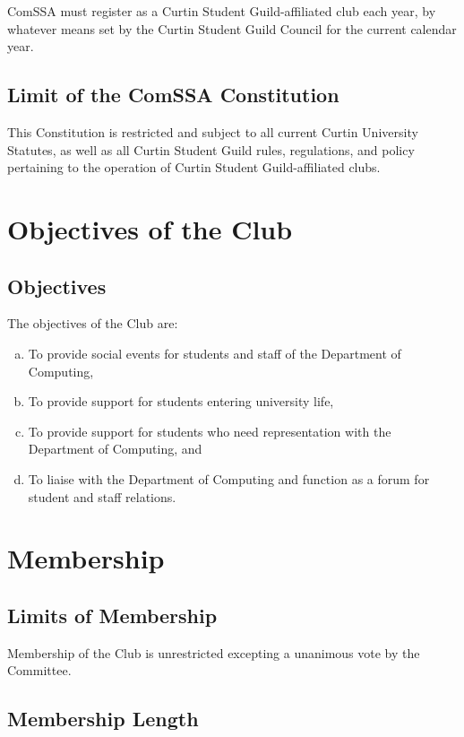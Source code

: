 \documentclass[a4paper,12pt]{article}
\begin{document}
ComSSA must register as a Curtin Student Guild-affiliated club each year, by whatever means set by the Curtin Student Guild Council for the current calendar year.

\subsection{Limit of the ComSSA Constitution}

This Constitution is restricted and subject to all current Curtin University Statutes, as well as all Curtin Student Guild rules, regulations, and policy pertaining to the operation of Curtin Student Guild-affiliated clubs.

\section{Objectives of the Club}

\subsection{Objectives}

The objectives of the Club are:

\begin{enumerate}[a)]
	\item To provide social events for students and staff of the Department of Computing,
	\item To provide support for students entering university life,
	\item To provide support for students who need representation with the Department of Computing, and
	\item To liaise with the Department of Computing and function as a forum for student and staff relations.
\end{enumerate}

\section{Membership}

\subsection{Limits of Membership}

Membership of the Club is unrestricted excepting a unanimous vote by the Committee.

\subsection{Membership Length}
\end{document}
